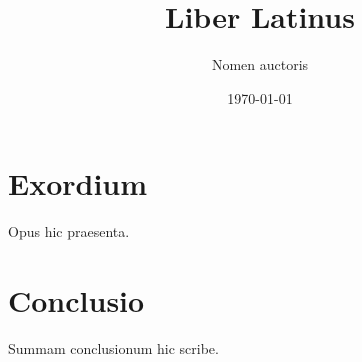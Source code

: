 \documentclass[11pt]{book}
\title{Liber Latinus}
\author{Nomen auctoris}
\date{\today}
\begin{document}
\maketitle
\tableofcontents

\chapter{Exordium}
Opus hic praesenta.

\chapter{Conclusio}
Summam conclusionum hic scribe.
\end{document}
